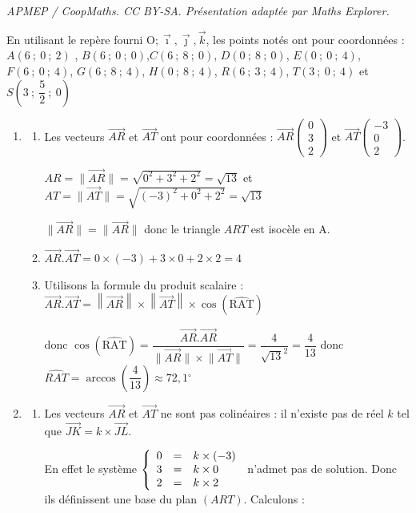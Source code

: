 \documentclass[10pt]{article}
\providecommand{\degres}{\ensuremath{^\circ}}
\providecommand{\vect}[1]{\overrightarrow{#1}}
\providecommand{\degres}{{^\circ}}
\providecommand{\Oijk}{\(\mathrm{O};\vec{\imath},\vec{\jmath},\vec{k}\)}
\begin{document}
\noindent\textit{APMEP / CoopMaths. CC BY-SA. Présentation adaptée par Maths Explorer.}\par\medskip
\medskip
En utilisant le repère fourni \Oijk, les points notés ont pour coordonnées : 
$A\left(6~;~0~;~2\right)$ , $B\left(6~;~0~;~0\right)$,$C\left(6~;~8~;~0\right)$, $D\left(0~;~8~;~0\right)$, $E\left(0~;~0~;~4\right)$, $F\left(6~;~0~;~4\right)$, $G\left(6~;~8~;~4\right)$, $H\left(0~;~8~;~4\right)$, $R\left(6~;~3~;~4\right)$, $T\left(3~;~0~;~4\right)$ et $S\left(3~;~\dfrac52~;~0\right)$

\begin{enumerate}
	\item 
	\begin{enumerate}
		\item Les vecteurs $\vect{AR}$ et $\vect{AT}$ ont pour coordonnées : \(\overrightarrow{AR}\begin{pmatrix}0\\3\\2\end{pmatrix}\) et \(\overrightarrow{AT}\begin{pmatrix}-3\\0\\2\end{pmatrix}\).
		
		$AR=\lVert\vect{AR}\rVert=\sqrt{0^2+3^2+2^2}=\sqrt{13}$ et $AT=\lVert\vect{AT}\rVert=\sqrt{(-3)^2+0^2+2^2}=\sqrt{13}$
			
		$\lVert\vect{AR}\rVert=\lVert\vect{AR}\rVert$ donc le triangle $ART$ est isocèle en A.
		\item $\vect{AR}.\vect{AT}=0\times(-3)+3\times 0+2\times 2 = 4$
		\item Utilisons la formule du produit scalaire : $\vect{AR}.\vect{AT}= \left\|\vect{AR}\right\| \times \left\|\vect{AT}\right\| \times \cos \left(\widehat{\text{RAT}}\right)$ 
		
donc
		$\cos \left(\widehat{\text{RAT}}\right) = \dfrac{\vect{AR}.\vect{AR}}{\lVert\vect{AR}\rVert \times \lVert\vect{AT}\rVert}=\dfrac{4}{\sqrt{13}^2}=\dfrac{4}{13}$ donc $\widehat{RAT}=\arccos\left(\dfrac{4}{13}\right)\approx 72,1 \degres$
	\end{enumerate}
\item 
	\begin{enumerate}
		\item Les vecteurs $\vect{AR}$ et $\vect{AT}$ ne sont pas colinéaires : il n'existe pas de réel $k$ tel que $\vect{JK}=k\times \vect{JL}$.
		
		En effet le système $\left\{\begin{array}{l c l} 0&=&k\times (-3)\\3 &=& k\times 0\\2&=& k\times 2 \end{array}\right.$ n'admet pas de solution.
		Donc ils définissent une base du plan $(ART)$.
		Calculons :
		

\end{enumerate}
\end{enumerate}
\end{document}
